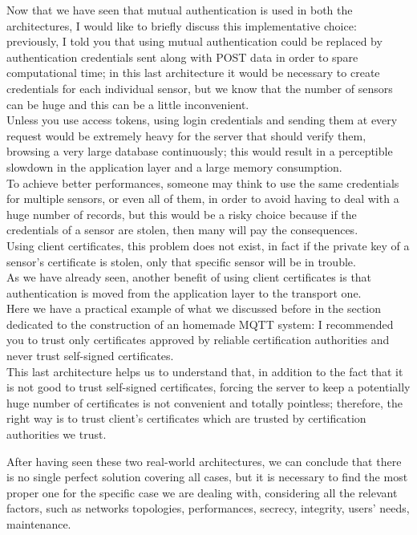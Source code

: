 \documentclass[12pt]{report}
\begin{document}
{{Now that we have seen that mutual authentication is used in both the architectures, I would like to briefly discuss this implementative choice: previously, I told you that using mutual authentication could be replaced by authentication credentials sent along with POST data in order to spare computational time; in this last architecture it would be necessary to create credentials for each individual sensor, but we know that the number of sensors can be huge and this can be a little inconvenient.\\
Unless you use access tokens, using login credentials and sending them at every request would be extremely heavy for the server that should verify them, browsing a very large database continuously; this would result in a perceptible slowdown in the application layer and a large memory consumption.\\
To achieve better performances, someone may think to use the same credentials for multiple sensors, or even all of them, in order to avoid having to deal with a huge number of records, but this would be a risky choice because if the credentials of a sensor are stolen, then many will pay the consequences.\\
Using client certificates, this problem does not exist, in fact if the private key of a sensor's certificate is stolen, only that specific sensor will be in trouble.\\
As we have already seen, another benefit of using client certificates is that authentication is moved from the application layer to the transport one.\\

Here we have a practical example of what we discussed before in the section dedicated to the construction of an homemade MQTT system: I recommended you to trust only certificates approved by reliable certification authorities and never trust self-signed certificates. \\
This last architecture helps us to understand that, in addition to the fact that it is not good to trust self-signed certificates, forcing the server to keep a potentially huge number of certificates is not convenient and totally pointless; therefore, the right way is to trust client's certificates which are trusted by certification authorities we trust.\\

\bigskip

After having seen these two real-world architectures, we can conclude that there is no single perfect solution covering all cases, but it is necessary to find the most proper one for the specific case we are dealing with, considering all the relevant factors, such as networks topologies, performances, secrecy, integrity, users' needs, maintenance.\\



}}
\end{document}

